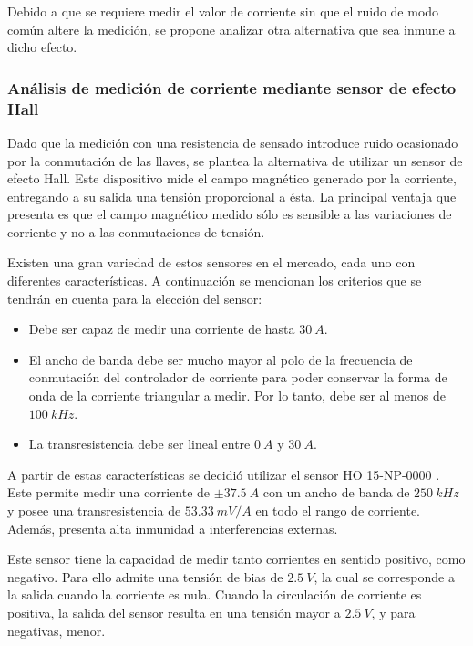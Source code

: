 Debido a que se requiere medir el valor de corriente sin que el ruido de modo común altere la medición, se propone analizar otra alternativa que sea inmune a dicho efecto.


\subsubsection{Análisis de medición de corriente mediante sensor de efecto Hall}

Dado que la medición con una resistencia de sensado introduce ruido ocasionado por la conmutación de las llaves, se plantea la alternativa de utilizar un sensor de efecto Hall. Este dispositivo mide el campo magnético generado por la corriente, entregando a su salida una tensión proporcional a ésta. La principal ventaja que presenta es que el campo magnético medido sólo es sensible a las variaciones de corriente y no a las conmutaciones de tensión.

Existen una gran variedad de estos sensores en el mercado, cada uno con diferentes características. A continuación se mencionan los criterios que se tendrán en cuenta para la elección del sensor:

\begin{itemize}
	\item Debe ser capaz de medir una corriente de hasta $30\:A$.
	\item El ancho de banda debe ser mucho mayor al polo de la frecuencia de conmutación del controlador de corriente para poder conservar la forma de onda de la corriente triangular a medir. Por lo tanto, debe ser al menos de $100\:kHz$.
	\item La transresistencia debe ser lineal entre $0\:A$ y $30\:A$.	
\end{itemize}

A partir de estas características se decidió utilizar el sensor HO 15-NP-0000 \cite{HO15-NP}. Este permite medir una corriente de $\pm 37.5\:A$ con un ancho de banda de $250\:kHz$ y posee una transresistencia de $53.33\:mV/A$ en todo  el rango de corriente. Además, presenta alta inmunidad a interferencias externas. 

Este sensor tiene la capacidad de medir tanto corrientes en sentido positivo, como negativo. Para ello admite una tensión de bias de $2.5\:V$, la cual se corresponde a la salida cuando la corriente es nula. Cuando la circulación de corriente es positiva, la salida del sensor resulta en una tensión mayor a $2.5\:V$, y para negativas, menor.

